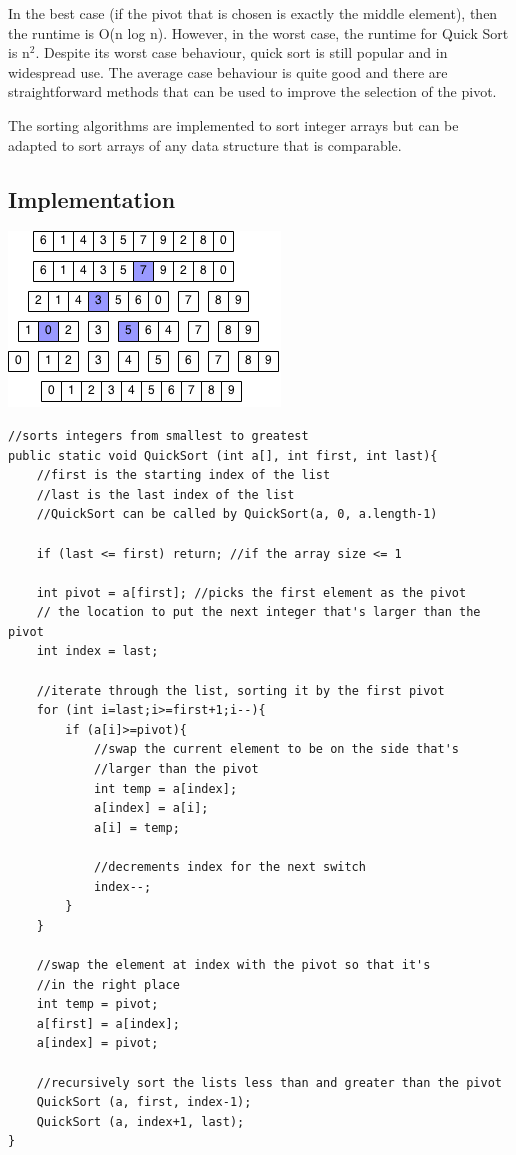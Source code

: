 \documentclass[11pt,oneside]{book}
\makeatletter
\def\maxwidth#1{\ifdim\Gin@nat@width>#1 #1\else\Gin@nat@width\fi}
\makeatother
\begin{document}
In the best case (if the pivot that is chosen is exactly the middle element), then the runtime is O(n log n). However, in the worst case, the runtime for Quick Sort is n$^{2}$. Despite its worst case behaviour, quick sort is still popular and in widespread use. The average case behaviour is quite good and there are straightforward methods that can be used to improve the selection of the pivot.

The sorting algorithms are implemented to sort integer arrays but can be adapted to sort arrays of any data structure that is comparable.

\subsection{Implementation}

\vspace{5px}\includegraphics[width=\maxwidth{\textwidth}]{quicksort.png}

\begin{lstlisting}
//sorts integers from smallest to greatest
public static void QuickSort (int a[], int first, int last){
    //first is the starting index of the list
    //last is the last index of the list
    //QuickSort can be called by QuickSort(a, 0, a.length-1)
    
    if (last <= first) return; //if the array size <= 1
    
    int pivot = a[first]; //picks the first element as the pivot
    // the location to put the next integer that's larger than the pivot
    int index = last;  
    
    //iterate through the list, sorting it by the first pivot
    for (int i=last;i>=first+1;i--){
        if (a[i]>=pivot){
            //swap the current element to be on the side that's 
            //larger than the pivot
            int temp = a[index];
            a[index] = a[i];
            a[i] = temp;
            
            //decrements index for the next switch
            index--;
        }
    }
    
    //swap the element at index with the pivot so that it's 
    //in the right place
    int temp = pivot;
    a[first] = a[index];
    a[index] = pivot;
    
    //recursively sort the lists less than and greater than the pivot
    QuickSort (a, first, index-1);
    QuickSort (a, index+1, last);
}
\end{lstlisting}
\end{document}
